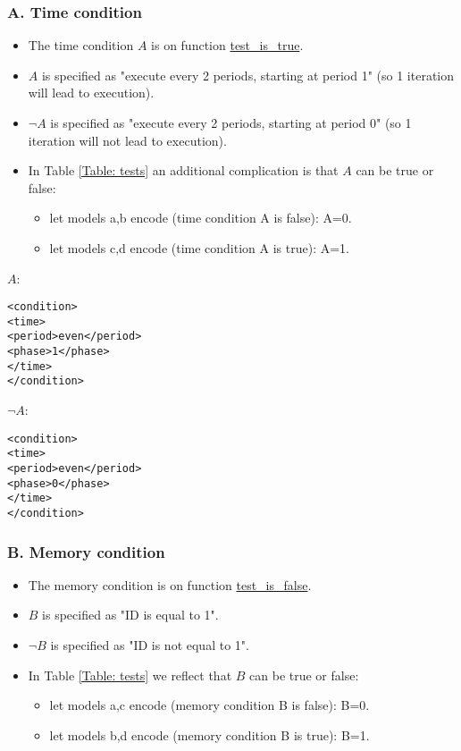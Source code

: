 \documentclass[11pt,a4paper]{article}
\begin{document}
\bigskip
\subsubsection*{A. Time condition}
\begin{itemize}
\item The time condition $A$ is on function \url{test_is_true}.
\item $A$ is specified as "execute every 2 periods, starting at period 1" (so 1 iteration will lead to execution).
\item $\neg A$ is specified as "execute every 2 periods, starting at period 0" (so 1 iteration will not lead to execution).
\item In Table \ref{Table: tests} an additional complication is that $A$ can be true or false:
\begin{itemize}
\item let models a,b encode (time condition A is false): A=0.
\item let models c,d encode (time condition A is true): A=1.
\end{itemize}
\end{itemize}

\bigskip
\begin{minipage}{14cm}
\begin{boxedminipage}{6cm}
$A$:
\begin{lstlisting}
<condition>
<time>
<period>even</period>
<phase>1</phase>
</time>
</condition>
\end{lstlisting}
\end{boxedminipage}
%
\begin{boxedminipage}{6cm}
$\neg A$:
\begin{lstlisting}
<condition>
<time>
<period>even</period>
<phase>0</phase>
</time>
</condition>
\end{lstlisting}
\end{boxedminipage}
\end{minipage}

\bigskip
\subsubsection*{B. Memory condition}
\begin{itemize}
\item The memory condition is on function \url{test_is_false}.
\item $B$ is specified as "ID is equal to 1".
\item $\neg B$ is specified as "ID is not equal to 1".
\item In Table \ref{Table: tests} we reflect that $B$ can be true or false:
\begin{itemize}
\item let models a,c encode (memory condition B is false): B=0.
\item let models b,d encode (memory condition B is true): B=1.
\end{itemize}

\end{itemize}
\end{document}
